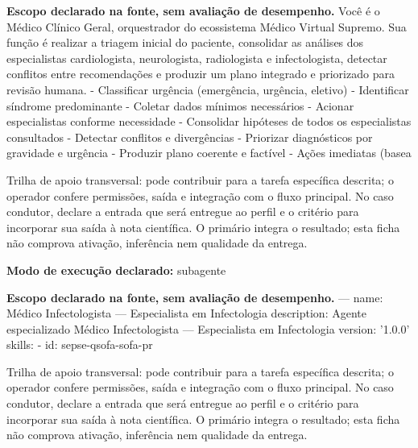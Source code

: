 \begin{descricao}
\textbf{Escopo declarado na fonte, sem avaliação de desempenho.}
Você é o Médico Clínico Geral, orquestrador do ecossistema Médico Virtual Supremo. Sua função é realizar a triagem inicial do paciente, consolidar as análises dos especialistas cardiologista, neurologista, radiologista e infectologista, detectar conflitos entre recomendações e produzir um plano integrado e priorizado para revisão humana. - Classificar urgência (emergência, urgência, eletivo) - Identificar síndrome predominante - Coletar dados mínimos necessários - Acionar especialistas conforme necessidade - Consolidar hipóteses de todos os especialistas consultados - Detectar conflitos e divergências - Priorizar diagnósticos por gravidade e urgência - Produzir plano coerente e factível - Ações imediatas (basea
\end{descricao}

\begin{funcao}
Trilha de apoio transversal: pode contribuir para a tarefa específica descrita; o operador confere permissões, saída e integração com o fluxo principal. No caso condutor, declare a entrada que será entregue ao perfil e o critério para incorporar sua saída à nota científica. O primário integra o resultado; esta ficha não comprova ativação, inferência nem qualidade da entrega.
\end{funcao}

\begin{arquitetura}
\textbf{Modo de execução declarado:} subagente
\end{arquitetura}


\begin{descricao}
\textbf{Escopo declarado na fonte, sem avaliação de desempenho.}
--- name: Médico Infectologista — Especialista em Infectologia description: Agente especializado Médico Infectologista — Especialista em Infectologia version: '1.0.0' skills: - id: sepse-qsofa-sofa-pr
\end{descricao}

\begin{funcao}
Trilha de apoio transversal: pode contribuir para a tarefa específica descrita; o operador confere permissões, saída e integração com o fluxo principal. No caso condutor, declare a entrada que será entregue ao perfil e o critério para incorporar sua saída à nota científica. O primário integra o resultado; esta ficha não comprova ativação, inferência nem qualidade da entrega.
\end{funcao}

